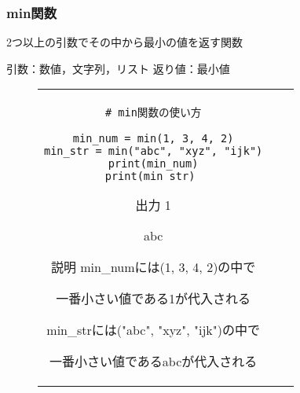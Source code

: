 \documentclass{jsarticle}
\begin{document}
\subsubsection{min関数}
2つ以上の引数でその中から最小の値を返す関数 \par
引数：数値，文字列，リスト \hspace{5mm}
返り値：最小値
\vspace{-5mm}
\begin{figure}[h]
	\begin{tabular}{ccc}
		\begin{minipage}[t]{.4\textwidth}
			\begin{lstlisting}[caption=min関数]
# min関数の使い方

min_num = min(1, 3, 4, 2)
min_str = min("abc", "xyz", "ijk")
print(min_num)
print(min_str) \end{lstlisting}
		\end{minipage} \hspace{5mm}
		\begin{minipage}[t]{.1\textwidth}
			\begin{itembox}[l]{出力}
				1 \par
				abc \par
			\end{itembox}
		\end{minipage} \hspace{5mm}
		\begin{minipage}[t]{.45\textwidth}
			\begin{itembox}[l]{説明}
				min\_numには(1, 3, 4, 2)の中で\par 一番小さい値である1が代入される \par
				min\_strには("abc", "xyz", "ijk")の中で\par 一番小さい値であるabcが代入される \par
			\end{itembox}
		\end{minipage}
	\end{tabular}
\end{figure}

\end{document}
